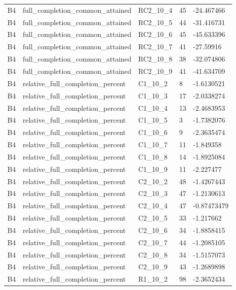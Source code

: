 \begin{longtable}{lllll}
B4 & full\_completion\_common\_attained & RC2\_10\_4 & 45 & -24.467466 \\
B4 & full\_completion\_common\_attained & RC2\_10\_5 & 44 & -31.416731 \\
B4 & full\_completion\_common\_attained & RC2\_10\_6 & 45 & -45.633396 \\
B4 & full\_completion\_common\_attained & RC2\_10\_7 & 41 & -27.59916 \\
B4 & full\_completion\_common\_attained & RC2\_10\_8 & 38 & -32.074806 \\
B4 & full\_completion\_common\_attained & RC2\_10\_9 & 41 & -41.634709 \\
B4 & relative\_full\_completion\_percent & C1\_10\_2 & 8 & -1.6130521 \\
B4 & relative\_full\_completion\_percent & C1\_10\_3 & 17 & -2.0338274 \\
B4 & relative\_full\_completion\_percent & C1\_10\_4 & 13 & -2.4683953 \\
B4 & relative\_full\_completion\_percent & C1\_10\_5 & 3 & -1.7382076 \\
B4 & relative\_full\_completion\_percent & C1\_10\_6 & 9 & -2.3635474 \\
B4 & relative\_full\_completion\_percent & C1\_10\_7 & 11 & -1.849358 \\
B4 & relative\_full\_completion\_percent & C1\_10\_8 & 14 & -1.8925084 \\
B4 & relative\_full\_completion\_percent & C1\_10\_9 & 11 & -2.227477 \\
B4 & relative\_full\_completion\_percent & C2\_10\_2 & 48 & -1.4267443 \\
B4 & relative\_full\_completion\_percent & C2\_10\_3 & 47 & -1.2130613 \\
B4 & relative\_full\_completion\_percent & C2\_10\_4 & 47 & -0.87473479 \\
B4 & relative\_full\_completion\_percent & C2\_10\_5 & 33 & -1.217662 \\
B4 & relative\_full\_completion\_percent & C2\_10\_6 & 34 & -1.8858415 \\
B4 & relative\_full\_completion\_percent & C2\_10\_7 & 44 & -1.2085105 \\
B4 & relative\_full\_completion\_percent & C2\_10\_8 & 34 & -1.5157073 \\
B4 & relative\_full\_completion\_percent & C2\_10\_9 & 43 & -1.2689898 \\
B4 & relative\_full\_completion\_percent & R1\_10\_2 & 98 & -2.3652434 \\

\end{longtable}

